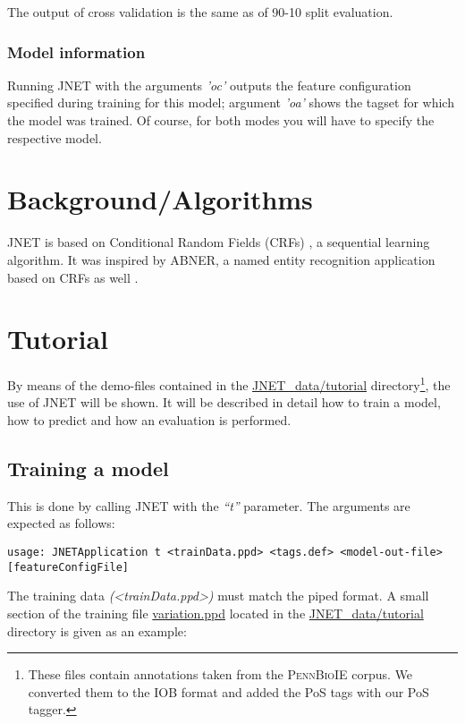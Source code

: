\documentclass[11pt,a4paper,halfparskip]{scrartcl}
\begin{document}
The output of cross validation is the same as of 90-10 split evaluation.




\subsubsection{Model information}
Running JNET with the arguments \textit{'oc'} outputs the feature
configuration specified during training for this model; argument
\textit{'oa'} shows the tagset for which the model was trained. Of
course, for both modes you will have to specify the respective model.

\section{Background/Algorithms}
\label{sec:background}

JNET is based on Conditional Random Fields (CRFs) \cite{Lafferty2001}, a
sequential learning algorithm. It was inspired by ABNER, a named
entity recognition application based on CRFs as well \cite{Settles2004}.


\section{Tutorial}
\label{sec:tutorial}

By means of the demo-files contained in the \url{JNET_data/tutorial}
directory\footnote{These files contain annotations taken from the
  \textsc{PennBioIE} corpus. We converted them to the IOB format and
  added the PoS tags with our PoS tagger.}, the use of JNET will be shown.
It will be described in detail how to train a model, how to predict
and how an evaluation is performed.

\subsection{Training a model}
This is done by calling JNET with the \textit{``t''} parameter. The arguments
are expected as follows:

\begin{verbatim}
usage: JNETApplication t <trainData.ppd> <tags.def> <model-out-file>
[featureConfigFile]
\end{verbatim}

The training data \textit{(<trainData.ppd>)} must match the piped format. A
small section of the training file \url{variation.ppd} located in the
\url{JNET_data/tutorial} directory is given as an example:
\end{document}
